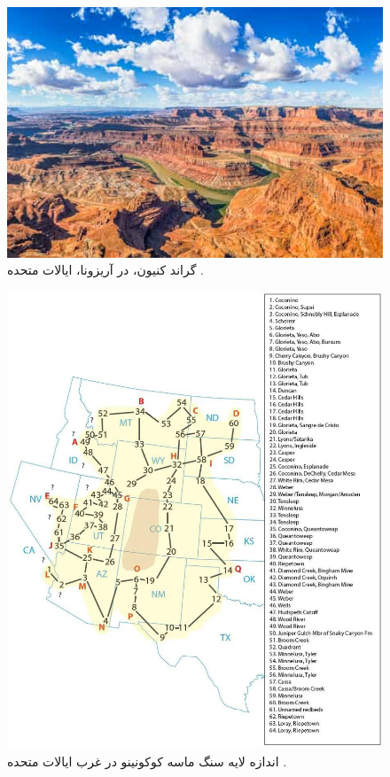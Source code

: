 \documentclass[10pt,twocolumn,letterpaper]{article}
\begin{document}
\begin{figure}[b]
\begin{center}
   \includegraphics[width=1\linewidth]{grand-canyon.jpg}
\end{center}
   \caption{گراند کنیون، در آریزونا، ایالات متحده \cite{49}.}
\label{fig:2}
\label{fig:onecol}
\end{figure}

\begin{figure}[t]
\begin{center}
   \includegraphics[width=1\linewidth]{coconino.jpg}
\end{center}
   \caption{اندازه لایه سنگ ماسه کوکونینو در غرب ایالات متحده \cite{21}.}
\label{fig:3}
\label{fig:onecol}
\end{figure}
\end{document}
